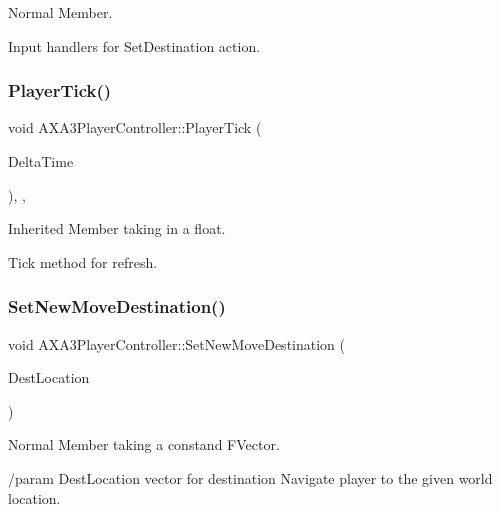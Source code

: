 Normal Member. 

Input handlers for Set\+Destination action. \hypertarget{class_a_x_a3_player_controller_a4517394eaa773561191813ea4c2959b6}{}\label{class_a_x_a3_player_controller_a4517394eaa773561191813ea4c2959b6} 
\subsubsection{\texorpdfstring{Player\+Tick()}{PlayerTick()}}
{\footnotesize\ttfamily void A\+X\+A3\+Player\+Controller\+::\+Player\+Tick (\begin{DoxyParamCaption}\item[{float}]{Delta\+Time }\end{DoxyParamCaption})\hspace{0.3cm}{\ttfamily [override]}, {\ttfamily [protected]}, {\ttfamily [virtual]}}



Inherited Member taking in a float. 

Tick method for refresh. \hypertarget{class_a_x_a3_player_controller_aa419797ca4c60bb27a033a307c5ccbee}{}\label{class_a_x_a3_player_controller_aa419797ca4c60bb27a033a307c5ccbee} 
\subsubsection{\texorpdfstring{Set\+New\+Move\+Destination()}{SetNewMoveDestination()}}
{\footnotesize\ttfamily void A\+X\+A3\+Player\+Controller\+::\+Set\+New\+Move\+Destination (\begin{DoxyParamCaption}\item[{const F\+Vector}]{Dest\+Location }\end{DoxyParamCaption})}



Normal Member taking a constand F\+Vector. 

/param Dest\+Location vector for destination Navigate player to the given world location. \hypertarget{class_a_x_a3_player_controller_ae1a9e48d7cb021a81ea0357b3be6afa6}{}\label{class_a_x_a3_player_controller_ae1a9e48d7cb021a81ea0357b3be6afa6} 
